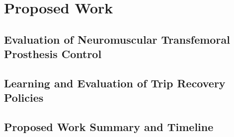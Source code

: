 \chapter{Proposed Work}

\section{Evaluation of Neuromuscular Transfemoral Prosthesis Control}

\section{Learning and Evaluation of Trip Recovery Policies}
\label{sec:proposed_trip_recovery}

\section{Proposed Work Summary and Timeline}
